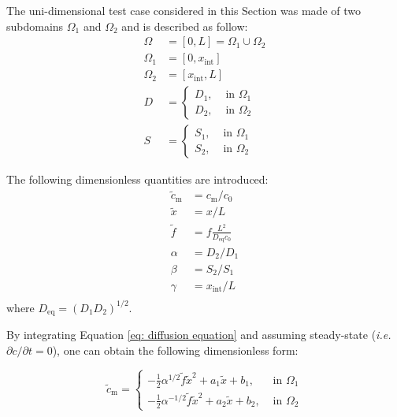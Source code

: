 The uni-dimensional test case considered in this Section was made of two subdomains $\Omega_1$ and $\Omega_2$ and is described as follow:
\begin{subequations}
\begin{align}
    \Omega &= [0, L] = \Omega_1 \cup \Omega_2 \\
    \Omega_1 &= [0, x_\mathrm{int}] \\
    \Omega_2 &= [x_\mathrm{int}, L] \\
    D &= \begin{cases}
        D_1,& \text{ in } \Omega_1\\
        D_2,& \text{ in } \Omega_2
    \end{cases} \\
    S &= \begin{cases}
        S_1,& \text{ in } \Omega_1\\
        S_2,& \text{ in } \Omega_2
    \end{cases}
\end{align}
\end{subequations}

The following dimensionless quantities are introduced:
\begin{subequations}
    \begin{align}
        \tilde{c}_\mathrm{m} &= c_\mathrm{m} / c_0\\
        \tilde{x} &= x / L \\
        \tilde{f} &= f \frac{L^2}{D_\mathrm{eq} c_0} \\
        \alpha &= D_2/D_1 \\
        \beta &= S_2/S_1 \\
        \gamma &= x_\mathrm{int}/L\\
    \end{align} 
\end{subequations}
where $D_\mathrm{eq} = (D_1 D_2)^{1/2}$.

By integrating Equation \ref{eq: diffusion equation} and assuming steady-state (\textit{i.e.} $\partial c/\partial t=0$), one can obtain the following dimensionless form:

\begin{equation}
        \tilde{c}_\mathrm{m}= 
\begin{cases}
    -\frac{1}{2}\alpha^{1/2}\tilde{f} \tilde{x}^2 + a_1 \tilde{x} + b_1,& \text{ in } \Omega_1\\
    -\frac{1}{2}\alpha^{-1/2}\tilde{f} \tilde{x}^2 + a_2 \tilde{x} + b_2,& \text{ in } \Omega_2
\end{cases}
\label{eq:MES c}
\end{equation}

